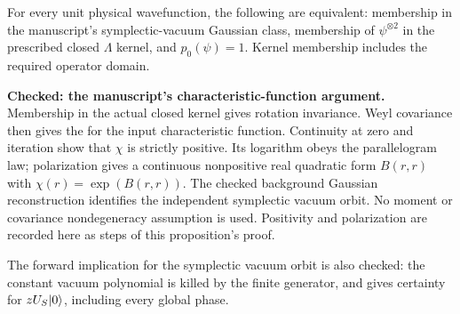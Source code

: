 \begin{proposition}\label{prp:mean-zero-gaussian}
  \par
  \leanok
  For every unit physical wavefunction, the following are equivalent:
  membership in the manuscript's symplectic-vacuum Gaussian class,
  membership of $\psi^{\otimes2}$ in the prescribed closed $\Lambda$ kernel,
  and $p_0(\psi)=1$. Kernel membership includes the required operator domain.

  \textbf{Checked: the manuscript's characteristic-function argument.}
  Membership in the actual closed kernel gives rotation invariance. Weyl
  covariance then gives the 
  for the input characteristic function. Continuity at zero and iteration
  show that $\chi$ is strictly positive. Its logarithm obeys the parallelogram
  law; polarization gives a continuous nonpositive real quadratic form $B(r,r)$
  with $\chi(r)=\exp(B(r,r))$. The checked background Gaussian reconstruction
  identifies the independent symplectic vacuum orbit. No moment or covariance
  nondegeneracy assumption is used. Positivity and polarization are recorded
  here as steps of this proposition's proof.

  The forward implication for the symplectic vacuum orbit is also checked:
  the constant vacuum polynomial is killed by the finite generator, and
   gives certainty for
  $zU_S\lvert 0 \rangle$, including every global phase.

\end{proposition}

